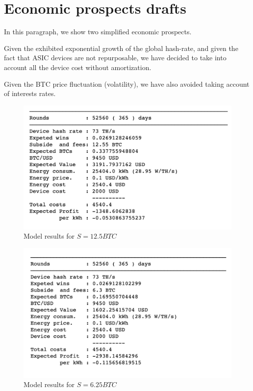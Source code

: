 \documentclass{book}
\theoremstyle{definition}
\begin{document}
\section{Economic prospects drafts}

In this paragraph, we show two simplified economic prospects.

Given the exhibited exponential growth of the global hash-rate, and given the fact that ASIC devices are not repurposable, we have decided to take into account all the device cost without amortization.

Given the BTC price fluctuation (volatility), we have also avoided taking account of interests rates.

\begin{figure}[ht]
    \centering
    \includegraphics[scale=0.50]{img/results-12.png}
    \caption{Model results for $S = 12.5 BTC$}
    \label{fig:results-12}
\end{figure}

\begin{figure}[ht]
    \centering
    \includegraphics[scale=0.50]{img/results.png}
    \caption{Model results for $S = 6.25 BTC$}
    \label{fig:results}
\end{figure}
\end{document}
